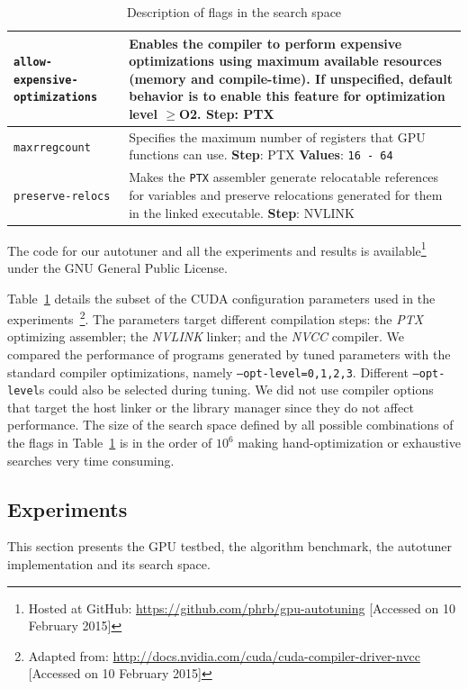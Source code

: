 \begin{table}[htpb]
\begin{tabular}{lp{}}
        \texttt{allow-expensive-optimizations} & Enables the compiler to perform expensive optimizations using maximum available resources (memory and compile-time). If unspecified, default behavior is to enable this feature for optimization level $\geqslant$O2. \textbf{Step}: PTX \\\midrule
        \texttt{maxrregcount} & Specifies the maximum number of registers that GPU functions can use. \textbf{Step}: PTX \textbf{Values}: \texttt{16 - 64} \\\midrule
        \texttt{preserve-relocs} & Makes the \texttt{PTX} assembler generate relocatable references for variables and preserve relocations generated for them in the linked executable. \textbf{Step}: NVLINK \\\midrule
        \end{tabular}
    \caption{Description of flags in the search space}
    \label{tab:flags}
\end{table}

The code for our autotuner and all the experiments and results is
available\footnote{Hosted at GitHub:
\url{https://github.com/phrb/gpu-autotuning} [Accessed on 10 February 2015]}
under the GNU General Public License.

Table~\ref{tab:flags} details the subset of the CUDA configuration parameters
used in the experiments~\footnote{Adapted from:
\url{http://docs.nvidia.com/cuda/cuda-compiler-driver-nvcc} [Accessed on 10
February 2015]}.  The parameters target different compilation steps: the
\emph{PTX} optimizing assembler; the \emph{NVLINK} linker; and the \emph{NVCC}
compiler.  We compared the performance of programs generated by tuned
parameters with the standard compiler optimizations, namely
\texttt{--opt-level=0,1,2,3}.  Different \texttt{--opt-level}s could also be
selected during tuning.  We did not use compiler options that target the host
linker or the library manager since they do not affect performance.  The size
of the search space defined by all possible combinations of the flags in
Table~\ref{tab:flags} is in the order of $10^{6}$ making hand-optimization or
exhaustive searches very time consuming.

\subsection{Experiments}

This section presents the GPU testbed, the algorithm benchmark, the
autotuner implementation and its search space.

